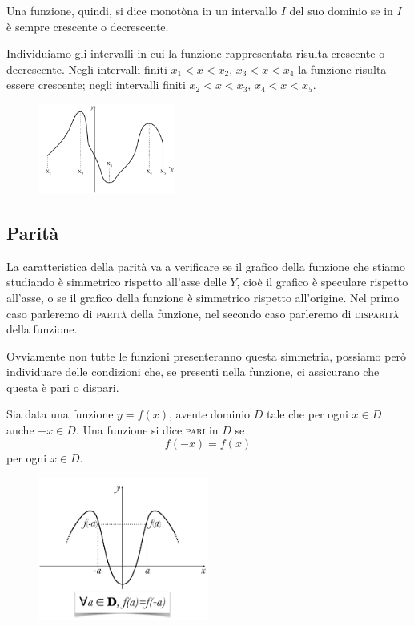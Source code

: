 Una funzione, quindi, si dice monotòna in un intervallo \(I\) del suo dominio 
se in \(I\) è sempre crescente o decrescente.

\begin{esempio}
Individuiamo gli intervalli in cui la funzione rappresentata risulta 
crescente o decrescente.
Negli intervalli finiti \(x_1<x<x_2\), \(x_3<x<x_4\) la funzione risulta essere 
crescente; negli intervalli finiti \(x_2<x<x_3\), \(x_4<x<x_5\).
% 
\begin{figure}[htpb!]
  \centering
  \includegraphics[width=0.4\textwidth]{img/funz_8.png}
\end{figure}
\end{esempio}
\subsection{Parità}
La caratteristica della parità va a verificare se il grafico della funzione 
che stiamo studiando è simmetrico rispetto all'asse delle \(Y\), cioè il 
grafico è speculare rispetto all'asse, o se il grafico della funzione è 
simmetrico rispetto all'origine. Nel primo caso parleremo di \textsc{parità} 
della funzione, nel secondo caso parleremo di \textsc{disparità} della 
funzione.

Ovviamente non tutte le funzioni presenteranno questa simmetria, possiamo 
però individuare delle condizioni che, se presenti nella funzione, ci 
assicurano che questa è pari o dispari.

\begin{definizione}
Sia data una funzione \(y=f(x)\), avente dominio \(D\) tale che per ogni \(x\in D\) 
anche \(-x\in D\). Una funzione si dice \textsc{pari} in \(D\) se 
\[f(-x)=f(x)\]
per ogni \(x\in D\).
\end{definizione}

\begin{figure}[htpb!]
  \centering
  \includegraphics[width=0.5\textwidth]{img/funz_9.png}
\end{figure}
%

